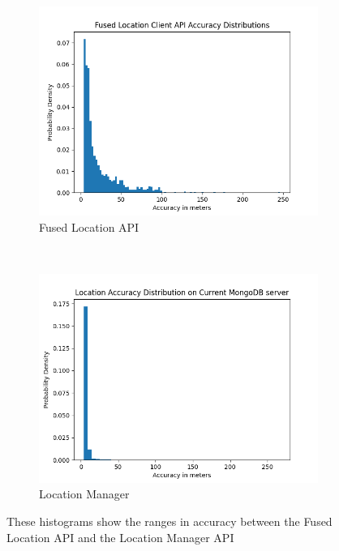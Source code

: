 \documentclass{l4proj}
\begin{document}
\begin{figure}
    \label{fig:phase2_ui}
    \centering
    \begin{subfigure}[b]{0.45\textwidth}
        \includegraphics[width=\textwidth]{images/fused_histogram.png}
        \caption{Fused Location API}
        \label{fig:fusedhist}
    \end{subfigure}
    ~ %
    \begin{subfigure}[b]{0.45\textwidth}
        \includegraphics[width=\textwidth]{images/mongo_db_histogram.png}
        \caption{Location Manager}
        \label{fig:mongohist}
    \end{subfigure}
    
    \caption{These histograms show the ranges in accuracy between the Fused Location API and the
    Location Manager API
    }
\end{figure}
\end{document}
